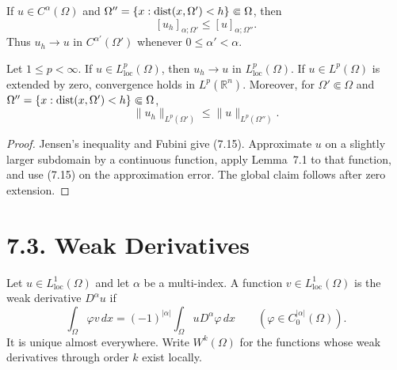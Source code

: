 If $u\in C^\alpha(\Omega)$ and
$\Omega''=\{x:\operatorname{dist}(x,\Omega')<h\}\Subset\Omega$, then
\begin{equation}
\tag{7.14}
[u_h]_{\alpha;\Omega'}\leq [u]_{\alpha;\Omega''}.
\end{equation}
Thus $u_h\to u$ in $C^{\alpha'}(\Omega')$ whenever
$0\leq\alpha'<\alpha$.

\begin{lemma}
\label{gt:lem-sobolev-regularization-lp}
Let $1\leq p<\infty$. If $u\in L^p_{\mathrm{loc}}(\Omega)$, then
$u_h\to u$ in $L^p_{\mathrm{loc}}(\Omega)$. If $u\in L^p(\Omega)$ is
extended by zero, convergence holds in $L^p(\mathbb R^n)$.
Moreover, for $\Omega'\Subset\Omega$ and
$\Omega''=\{x:\operatorname{dist}(x,\Omega')<h\}\Subset\Omega$,
\begin{equation}
\tag{7.15}
\|u_h\|_{L^p(\Omega')}\leq\|u\|_{L^p(\Omega'')}.
\end{equation}
\end{lemma}
\begin{proof}
\sketch Jensen's inequality and Fubini give (7.15). Approximate $u$ on a
slightly larger subdomain by a continuous function, apply Lemma~7.1 to that
function, and use (7.15) on the approximation error. The global claim follows
after zero extension.
\end{proof}

\section*{7.3. Weak Derivatives}

\begin{definition}
\label{gt:def-sobolev-weak-derivative}
Let $u\in L^1_{\mathrm{loc}}(\Omega)$ and let $\alpha$ be a multi-index.
A function $v\in L^1_{\mathrm{loc}}(\Omega)$ is the weak derivative
$D^\alpha u$ if
\begin{equation}
\tag{7.16}
\int_\Omega \varphi v\,dx
=(-1)^{|\alpha|}\int_\Omega uD^\alpha\varphi\,dx
\qquad(\varphi\in C_0^{|\alpha|}(\Omega)).
\end{equation}
It is unique almost everywhere. Write $W^k(\Omega)$ for the functions whose
weak derivatives through order $k$ exist locally.
\end{definition}

